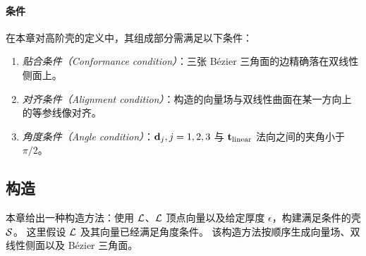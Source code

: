 \paragraph{条件}
在本章对高阶壳的定义中，其组成部分需满足以下条件：
\begin{enumerate}
    \item \emph{贴合条件（Conformance condition）}：三张 B\'{e}zier 三角面的边精确落在双线性侧面上。
    \item \emph{对齐条件（Alignment condition）}：构造的向量场与双线性曲面在某一方向上的等参线像对齐。
    \item \emph{角度条件（Angle condition）}：$\mathbf{d}_j, j=1,2,3$ 与 $\mathbf{t}_{\text{linear}}$ 法向之间的夹角小于 $\pi/2$。
\end{enumerate}






\subsection{构造}\label{sec:construct-from-L}
本章给出一种构造方法：使用 $\mathcal{L}$、$\mathcal{L}$ 顶点向量以及给定厚度 $\epsilon$，构建满足条件的壳 $\mathcal{S}$。
这里假设 $\mathcal{L}$ 及其向量已经满足角度条件。
该构造方法按顺序生成向量场、双线性侧面以及 B\'{e}zier 三角面。

